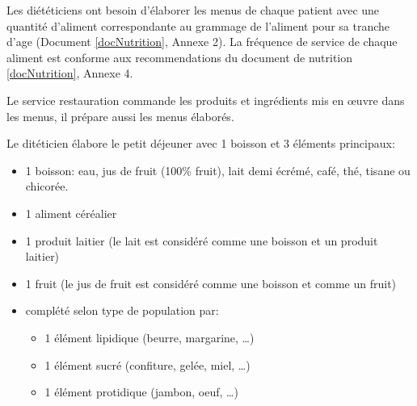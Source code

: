 Les diététiciens ont besoin d'élaborer les menus de chaque patient avec une quantité d'aliment correspondante au grammage de l'aliment pour sa tranche d'age (Document \ref{docNutrition}, Annexe 2). La fréquence de service de chaque aliment est conforme aux recommendations du document de nutrition \ref{docNutrition}, Annexe 4.

Le service restauration commande les produits et ingrédients mis en œuvre dans les menus, il prépare aussi les menus élaborés.

Le ditéticien élabore le petit déjeuner avec 1 boisson et 3 éléments principaux:
\begin{itemize}
 \item 1 boisson: eau, jus de fruit (100\% fruit), lait demi écrémé, café, thé, tisane ou chicorée. 
 \item 1 aliment céréalier
 \item 1 produit laitier (le lait est considéré comme une boisson et un produit laitier)
 \item 1 fruit (le jus de fruit est considéré comme une boisson et comme un fruit)
 \item complété selon type de population par:
 \begin{itemize}
  \item 1 élément lipidique (beurre, margarine, …)
  \item 1 élément sucré (confiture, gelée, miel, …)
  \item 1 élément protidique (jambon, oeuf, …)
 \end{itemize}
\end{itemize}

